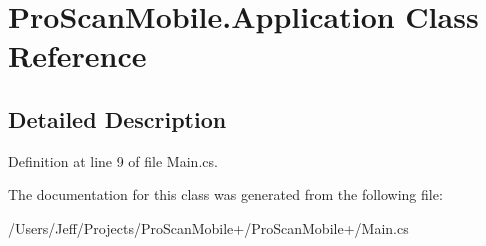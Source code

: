 \hypertarget{class_pro_scan_mobile_1_1_application}{\section{Pro\-Scan\-Mobile.\-Application Class Reference}
\label{class_pro_scan_mobile_1_1_application}
}


\subsection{Detailed Description}


Definition at line 9 of file Main.\-cs.



The documentation for this class was generated from the following file\-:\begin{DoxyCompactItemize}
\item 
/\-Users/\-Jeff/\-Projects/\-Pro\-Scan\-Mobile+/\-Pro\-Scan\-Mobile+/Main.\-cs\end{DoxyCompactItemize}

